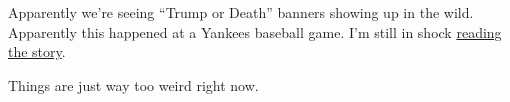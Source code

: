 Apparently we're seeing ``Trump or Death'' banners showing up in the
wild. Apparently this happened at a Yankees baseball game. I'm still in
shock
\href{http://web.archive.org/web/20230908044032/https://clutchpoints.com/fans-unveil-shocking-trump-or-death-banner-yankees-game}{reading
the story}.

Things are just way too weird right now.
